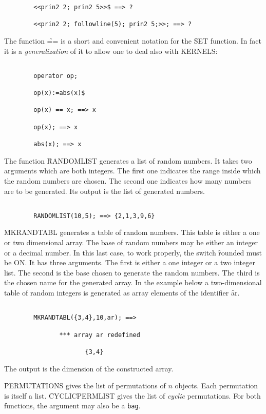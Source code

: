 \begin{itemize}
\begin{verbatim}
        <<prin2 2; prin2 5>>$ ==> ?

        <<prin2 2; followline(5); prin2 5;>>; ==> ?

\end{verbatim}
The function \f{==} is a short and convenient notation for the \f{SET}
function. In fact it is a {\em generalization} of it to allow one to
deal also with KERNELS:
\begin{verbatim}

        operator op;

        op(x):=abs(x)$

        op(x) == x; ==> x

        op(x); ==> x
        
        abs(x); ==> x

\end{verbatim}
The function \f{RANDOMLIST} generates a list of random numbers. It takes
two arguments which are both integers. The first one indicates the range
inside which the random numbers are chosen. The second one indicates how
many numbers are to be generated. Its output is the list of 
generated numbers.
\begin{verbatim}

        RANDOMLIST(10,5); ==> {2,1,3,9,6}

\end{verbatim}
\f{MKRANDTABL} generates a table of random numbers. This table is either
a one or two dimensional array. The base of random numbers may be either
an integer or a decimal number. In this last case, to work properly,
the switch \f{rounded} must be ON. It has three arguments. The first is
either a one integer or a two integer list. The second is the base chosen
to generate the random numbers. The third is the chosen name for the
generated array. In the example below a two-dimensional table of
random integers is generated as array elements of the identifier {\f ar}.
\begin{verbatim}

        MKRANDTABL({3,4},10,ar); ==>

               *** array ar redefined

                      {3,4}

\end{verbatim}
The output is the dimension of the constructed array.

\f{PERMUTATIONS} gives the list of permutations of $n$ objects.
Each permutation is itself a list. \f{CYCLICPERMLIST} gives the list of
{\em cyclic} permutations. For both functions, the argument may
also be a {\tt bag}.
\begin{verbatim}


\end{verbatim}
\end{itemize}
